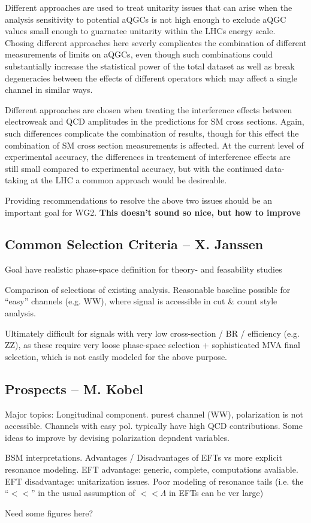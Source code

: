 Different approaches are used to treat unitarity issues that can arise when the analysis sensitivity to potential aQGCs is not high enough to exclude aQGC values small enough to guarnatee unitarity within the LHCs energy scale. Chosing different approaches here severly complicates the combination of different measurements of limits on aQGCs, even though such combinations could substantially increase the statistical power of the total dataset as well as break degeneracies between the effects of different operators which may affect a single channel in similar ways.

Different approaches are chosen when treating the interference effects between electroweak and QCD amplitudes in the predictions for SM cross sections. Again, such differences complicate the combination of results, though for this effect the combination of SM cross section measurements is affected. At the current level of experimental accuracy, the differences in treatement of interference effects are still small compared to experimental accuracy, but with the continued data-taking at the LHC a common approach would be desireable. 

Providing recommendations to resolve the above two issues should be an important goal for WG2. {\bf This doesn't sound so nice, but how to improve}

\subsection{Common Selection Criteria -- X. Janssen}

Goal have realistic phase-space definition for theory- and feasability studies

Comparison of selections of existing analysis.
Reasonable baseline possible for ``easy'' channels (e.g. WW), where signal is accessible in cut \& count style analysis.

Ultimately difficult for signals with very low cross-section / BR / efficiency (e.g. ZZ), as these require very loose phase-space selection + sophisticated MVA final selection, which is not easily modeled for the above purpose.

\subsection{Prospects -- M. Kobel}

Major topics:
Longitudinal component.
purest channel (WW), polarization is not accessible. Channels with easy pol. typically have high QCD contributions.
Some ideas to improve by devising polarization depndent variables.

BSM interpretations.
Advantages / Disadvantages of EFTs vs more explicit resonance modeling.
EFT advantage: generic, complete, computations avaliable.
EFT disadvantage: unitarization issues. Poor modeling of resonance tails (i.e. the ``$<<$'' in the usual assumption of $<<\Lambda$ in EFTs can be ver large)

Need some figures here?

